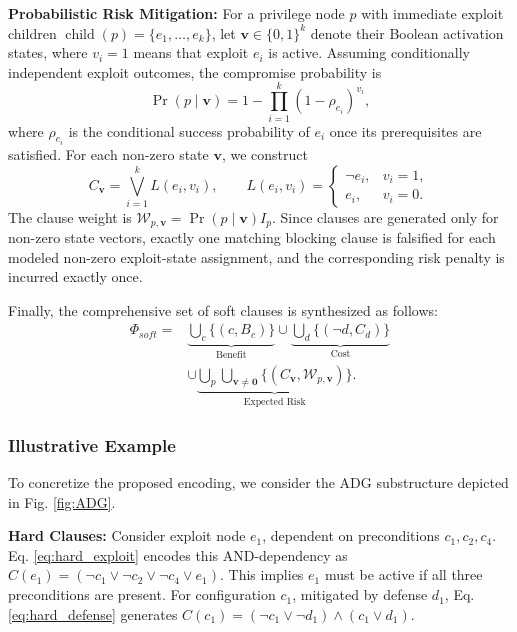 \documentclass[conference]{IEEEtran}
\theoremstyle{definition} %
\theoremstyle{plain} %
\begin{document}
\textbf{Probabilistic Risk Mitigation:}
For a privilege node $p$ with immediate exploit children $\operatorname{child}(p)=\{e_1,\ldots,e_k\}$, let $\mathbf{v}\in\{0,1\}^{k}$ denote their Boolean activation states, where $v_i=1$ means that exploit $e_i$ is active. Assuming conditionally independent exploit outcomes, the compromise probability is
\begin{equation}
\Pr(p\mid\mathbf{v})
=
1-\prod_{i=1}^{k}(1-\rho_{e_i})^{v_i},
\label{eq:prob}
\end{equation}
where $\rho_{e_i}$ is the conditional success probability of $e_i$ once its prerequisites are satisfied. For each non-zero state $\mathbf{v}$, we construct
\begin{equation}
C_{\mathbf{v}}
=
\bigvee_{i=1}^{k}L(e_i,v_i),
\qquad
L(e_i,v_i)
=
\begin{cases}
\neg e_i, & v_i=1,\\
e_i, & v_i=0.
\end{cases}
\label{eq:risk_clause}
\end{equation}
The clause weight is $\mathcal{W}_{p,\mathbf{v}}=\Pr(p\mid\mathbf{v})I_p$. Since clauses are generated only for non-zero state vectors, exactly one matching blocking clause is falsified for each modeled non-zero exploit-state assignment, and the corresponding risk penalty is incurred exactly once.

Finally, the comprehensive set of soft clauses is synthesized as follows:
\begin{equation}
\begin{aligned}
    \Phi_{soft} = &\underbrace{\bigcup_{c} \{(c, B_c)\}}_{\text{Benefit}} \cup \underbrace{\bigcup_{d} \{(\neg d, C_d)\}}_{\text{Cost}} \\
    &\cup \underbrace{\bigcup_{p} \bigcup_{\mathbf{v} \neq \mathbf{0}} \{(C_{\mathbf{v}}, \mathcal{W}_{p,\mathbf{v}})\}}_{\text{Expected Risk}}.
\end{aligned}
\label{eq:soft_risk_clause}
\end{equation}

\subsubsection{Illustrative Example}
To concretize the proposed encoding, we consider the ADG substructure depicted in Fig. \ref{fig:ADG}.

\textbf{Hard Clauses:} Consider exploit node $e_1$, dependent on preconditions $c_1, c_2, c_4$. Eq. \eqref{eq:hard_exploit} encodes this AND-dependency as $C(e_1) = (\neg c_1 \vee \neg c_2 \vee \neg c_4 \vee e_1)$. This implies $e_1$ must be active if all three preconditions are present. For configuration $c_1$, mitigated by defense $d_1$, Eq. \eqref{eq:hard_defense} generates $C(c_1) = (\neg c_1 \vee \neg d_1) \wedge (c_1 \vee d_1)$.
\end{document}
